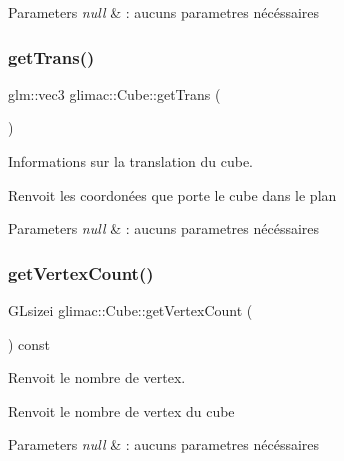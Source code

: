 \begin{DoxyParams}{Parameters}
{\em null} & \+: aucuns parametres nécéssaires \\
\hline
\end{DoxyParams}
\mbox{\label{classglimac_1_1Cube_a712b915cbe82f811229cedcb849e52fc}} 
\subsubsection{\texorpdfstring{get\+Trans()}{getTrans()}}
{\footnotesize\ttfamily glm\+::vec3 glimac\+::\+Cube\+::get\+Trans (\begin{DoxyParamCaption}{ }\end{DoxyParamCaption})\hspace{0.3cm}{\ttfamily [inline]}}



Informations sur la translation du cube. 

Renvoit les coordonées que porte le cube dans le plan


\begin{DoxyParams}{Parameters}
{\em null} & \+: aucuns parametres nécéssaires \\
\hline
\end{DoxyParams}
\mbox{\label{classglimac_1_1Cube_a579f0c59b840981a71c3fb068d290bfc}} 
\subsubsection{\texorpdfstring{get\+Vertex\+Count()}{getVertexCount()}}
{\footnotesize\ttfamily G\+Lsizei glimac\+::\+Cube\+::get\+Vertex\+Count (\begin{DoxyParamCaption}{ }\end{DoxyParamCaption}) const\hspace{0.3cm}{\ttfamily [inline]}}



Renvoit le nombre de vertex. 

Renvoit le nombre de vertex du cube


\begin{DoxyParams}{Parameters}
{\em null} & \+: aucuns parametres nécéssaires \\
\hline
\end{DoxyParams}
\mbox{\label{classglimac_1_1Cube_a46cb8692b9572361e283e88913089bad}} 
